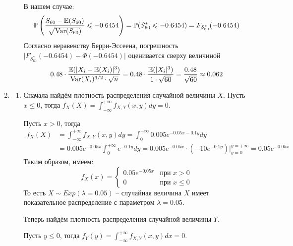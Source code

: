 \begin{enumerate}
\begin{enumerate}
В нашем случае:
\[
\operatorname{\mathbb{P}}\left( \frac{S_{60} - \operatorname{\mathbb{E}}(S_{60})}{\sqrt{\operatorname{Var}(S_{60})}} \leqslant -0.6454 \right) = \operatorname{\mathbb{P}}(S^*_{60} \leqslant -0.6454) =
F_{S^*_{60}} (-0.6454)
\]
Согласно неравенству Берри-Эссеена, погрешность $\vert F_{S^*_{60}} (-0.6454) - \Phi(-0.6454) \vert$ оценивается сверху величиной
\[
0.48 \cdot \frac{\operatorname{\mathbb{E}}(\vert X_i - \operatorname{\mathbb{E}}(X_i) \vert^3 )}{\operatorname{Var}(X_i)^{3/2} \cdot \sqrt{n}} = 0.48 \cdot \frac{\operatorname{\mathbb{E}}(\vert X_i \vert^3)}{1\cdot\sqrt{60}} = \frac{0.48}{\sqrt{60}} \approx0.062
\]
\end{enumerate}
\item \begin{enumerate}
\item Сначала найдём плотность распределения случайной величины $X$.
Пусть $x \leq 0 $, тогда $f_X (X) = \int_{-\infty}^{+\infty} f_{X, Y} (x, y) dy  = 0$.

Пусть $x >0 $, тогда
\begin{align*}
f_X (X) &= \int_{-\infty}^{+\infty} f_{X, Y} (x, y) dy = \int_{0}^{+\infty} 0.005 e^{-0.05x-0.1y} dy \\
&= 0.005e^{-0.05x} \int_{0}^{+\infty} e^{-0.1y} dy = 0.005e^{-0.05x} \cdot \left(-10e^{-0.1y} \right) \bigg\vert_{y=0}^{y=+\infty} = 0.05 e^{-0.05x}
\end{align*}
Таким образом, имеем:
\[
f_X (x) = \begin{cases}
0.05 e^{-0.05x} & \text{при } x>0 \\
0 & \text{при } x \leq 0
\end{cases}
\]
То есть $X \sim Exp(\lambda=0.05)$ – случайная величина $X$ имеет показательное
распределение с параметром $\lambda = 0.05$.

Теперь найдём плотность распределения случайной величины $Y$.

Пусть $y \leq 0 $, тогда $f_Y (y) = \int_{-\infty}^{+\infty} f_{X, Y} (x, y) dx  = 0$.


\end{enumerate}
\end{enumerate}
